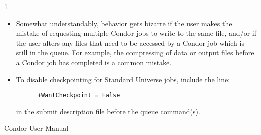 \begin{ManPage}{\label{man-condor-submit}}{1}
\begin{itemize}
\item Somewhat understandably, behavior gets bizarre if the user makes
the mistake of requesting multiple Condor jobs to write to the
same file, and/or if the user alters any files that need to be accessed
by a Condor job which is still in the queue.
For example, the compressing of data or
output files before a Condor job has completed is a common mistake.

\item To disable checkpointing for Standard Universe jobs, include the
line:
\begin{verbatim}
      +WantCheckpoint = False
\end{verbatim}
in the submit description file before the queue command(s).
\end{itemize}

\SeeAlso
Condor User Manual

\end{ManPage}

